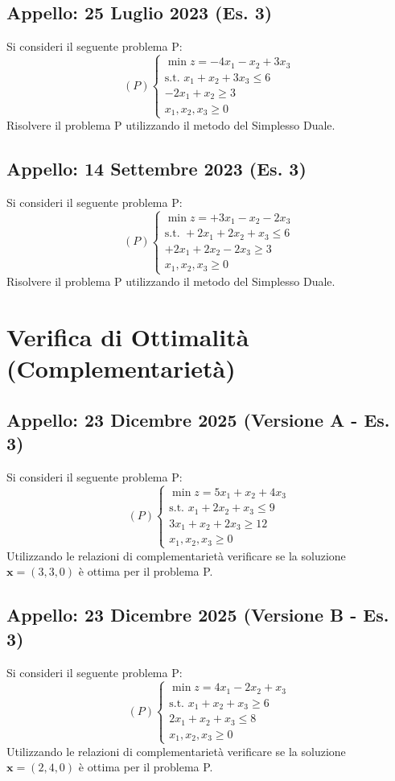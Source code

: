 \documentclass[11pt, a4paper]{article}
\begin{document}
\subsection{Appello: 25 Luglio 2023 (Es. 3)}
Si consideri il seguente problema P:
\[ (P) \begin{cases} \min z = -4x_1 - x_2 + 3x_3 \\ \text{s.t. } x_1 + x_2 + 3x_3 \le 6 \\ -2x_1 + x_2 \ge 3 \\ x_1, x_2, x_3 \ge 0 \end{cases} \]
Risolvere il problema P utilizzando il metodo del Simplesso Duale.

\subsection{Appello: 14 Settembre 2023 (Es. 3)}
Si consideri il seguente problema P:
\[ (P) \begin{cases} \min z = +3x_1 - x_2 - 2x_3 \\ \text{s.t. } +2x_1 + 2x_2 + x_3 \le 6 \\ +2x_1 + 2x_2 - 2x_3 \ge 3 \\ x_1, x_2, x_3 \ge 0 \end{cases} \]
Risolvere il problema P utilizzando il metodo del Simplesso Duale.

\section{Verifica di Ottimalità (Complementarietà)}

\subsection{Appello: 23 Dicembre 2025 (Versione A - Es. 3)}
Si consideri il seguente problema P:
\[ (P) \begin{cases} \min z = 5x_1 + x_2 + 4x_3 \\ \text{s.t. } x_1 + 2x_2 + x_3 \le 9 \\ 3x_1 + x_2 + 2x_3 \ge 12 \\ x_1, x_2, x_3 \ge 0 \end{cases} \]
Utilizzando le relazioni di complementarietà verificare se la soluzione $\mathbf{x} = (3,3,0)$ è ottima per il problema P.

\subsection{Appello: 23 Dicembre 2025 (Versione B - Es. 3)}
Si consideri il seguente problema P:
\[ (P) \begin{cases} \min z = 4x_1 - 2x_2 + x_3 \\ \text{s.t. } x_1 + x_2 + x_3 \ge 6 \\ 2x_1 + x_2 + x_3 \le 8 \\ x_1, x_2, x_3 \ge 0 \end{cases} \]
Utilizzando le relazioni di complementarietà verificare se la soluzione $\mathbf{x} = (2,4,0)$ è ottima per il problema P.
\end{document}
